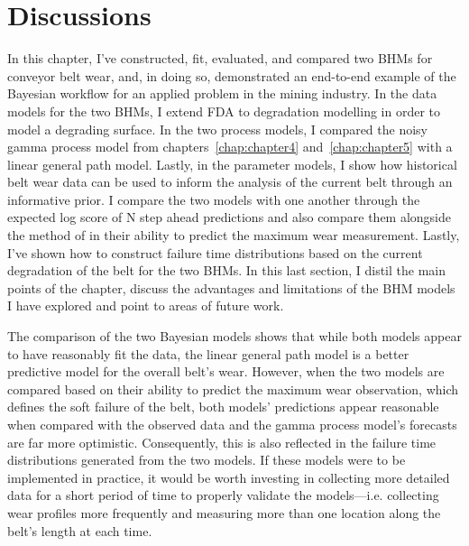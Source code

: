\section{Discussions} \label{sec:belt-wear-discussion}

In this chapter, I've constructed, fit, evaluated, and compared two BHMs for conveyor belt wear, and, in doing so, demonstrated an end-to-end example of the Bayesian workflow for an applied problem in the mining industry. In the data models for the two BHMs, I extend FDA to degradation modelling in order to model a degrading surface. In the two process models, I compared the noisy gamma process model from chapters~\ref{chap:chapter4} and~\ref{chap:chapter5} with a linear general path model. Lastly, in the parameter models, I show how historical belt wear data can be used to inform the analysis of the current belt through an informative prior. I compare the two models with one another through the expected log score of N step ahead predictions and also compare them alongside the method of \cite{webb_2020} in their ability to predict the maximum wear measurement. Lastly, I've shown how to construct failure time distributions based on the current degradation of the belt for the two BHMs. In this last section, I distil the main points of the chapter, discuss the advantages and limitations of the BHM models I have explored and point to areas of future work.

The comparison of the two Bayesian models shows that while both models appear to have reasonably fit the data, the linear general path model is a better predictive model for the overall belt's wear. However, when the two models are compared based on their ability to predict the maximum wear observation, which defines the soft failure of the belt, both models' predictions appear reasonable when compared with the observed data and the gamma process model's forecasts are far more optimistic. Consequently, this is also reflected in the failure time distributions generated from the two models. If these models were to be implemented in practice, it would be worth investing in collecting more detailed data for a short period of time to properly validate the models---i.e. collecting wear profiles more frequently and measuring more than one location along the belt's length at each time.

